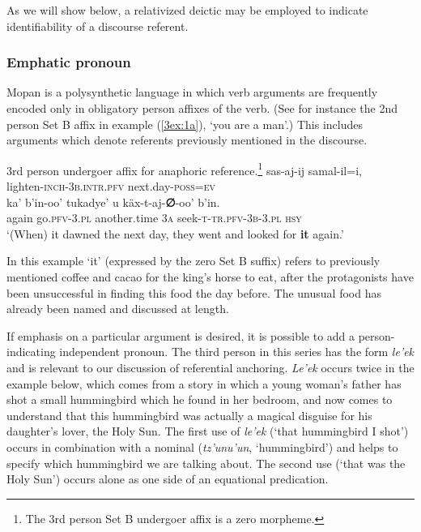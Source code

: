 \documentclass[output=paper]{langsci/langscibook}
\begin{document}
As we will show below, a relativized deictic may be employed to indicate identifiability of a discourse referent.

\subsubsection{Emphatic pronoun}\label{3sec:212}

Mopan is a polysynthetic language in which verb arguments are frequently encoded only in obligatory person affixes of the verb.  (See for instance the 2nd person Set B affix in example (\ref{3ex:1a}), `you are a man'.) This includes arguments which denote referents previously mentioned in the discourse.

\begin{exe}
\ex\label{3ex:5}
3rd person undergoer affix for anaphoric reference.\footnote{The 3rd person Set B undergoer affix is a zero morpheme.} 
\exi{}
\gll	sas-aj-ij 					samal-il=i, \\
	lighten-{\textsc{inch-3b.intr.pfv}}	next.day-{\textsc{poss=ev}} \\
\glt
\exi{}
\gll	ka' 		b'in-oo'			tukadye' 		u 		k\"ax-t-aj-{\textbf{∅}}-oo' 		b'in.	\\
	again	go.{\textsc{pfv-3.pl}}	another.time	{\textsc{3a}}	seek-{\textsc{t-tr.pfv-3b-3.pl}}	{\textsc{hsy}} \\
\glt	`(When) it dawned the next day, they went and looked for {\textbf{it}} again.'
\end{exe}

In this example `it' (expressed by the zero Set B suffix) refers to previously mentioned coffee and cacao for the king's horse to eat, after the protagonists have been unsuccessful in finding this food the day before. The unusual food has already been named and discussed at length.

If emphasis on a particular argument is desired, it is possible to add a person-indicating independent pronoun. The third person in this series has the form {\emph{le'ek}} and is relevant to our discussion of referential anchoring. {\emph{Le'ek}} occurs twice in the example below, which comes from a story in which a young woman's father has shot a small hummingbird which he found in her bedroom, and now comes to understand that this hummingbird was actually a magical disguise for his daughter's lover, the Holy Sun. The first use of {\emph{le'ek}} (`that hummingbird I shot') occurs in combination with a nominal ({\emph{tz'unu'un}}, `hummingbird') and helps to specify which hummingbird we are talking about. The second use (`that was the Holy Sun') occurs alone as one side of an equational predication.
\end{document}
